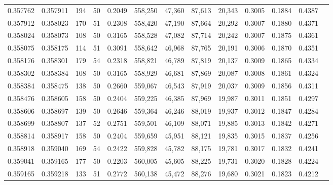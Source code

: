 \begin{tabular}{rrrrrrrrrrrrr}
0.357762 & 0.357911 &   194 &  50 &                                     0.2049 & 558,250 &  47,360 &  87,613 &  20,343 & 0.3005 & 0.1884 & 0.4387 \\
0.357912 & 0.358023 &   170 &  51 &                                     0.2308 & 558,420 &  47,190 &  87,664 &  20,292 & 0.3007 & 0.1880 & 0.4371 \\
0.358024 & 0.358073 &   108 &  50 &                                     0.3165 & 558,528 &  47,082 &  87,714 &  20,242 & 0.3007 & 0.1875 & 0.4361 \\
0.358075 & 0.358175 &   114 &  51 &                                     0.3091 & 558,642 &  46,968 &  87,765 &  20,191 & 0.3006 & 0.1870 & 0.4351 \\
0.358176 & 0.358301 &   179 &  54 &                                     0.2318 & 558,821 &  46,789 &  87,819 &  20,137 & 0.3009 & 0.1865 & 0.4334 \\
0.358302 & 0.358384 &   108 &  50 &                                     0.3165 & 558,929 &  46,681 &  87,869 &  20,087 & 0.3008 & 0.1861 & 0.4324 \\
0.358384 & 0.358475 &   138 &  50 &                                     0.2660 & 559,067 &  46,543 &  87,919 &  20,037 & 0.3009 & 0.1856 & 0.4311 \\
0.358476 & 0.358605 &   158 &  50 &                                     0.2404 & 559,225 &  46,385 &  87,969 &  19,987 & 0.3011 & 0.1851 & 0.4297 \\
0.358606 & 0.358697 &   139 &  50 &                                     0.2646 & 559,364 &  46,246 &  88,019 &  19,937 & 0.3012 & 0.1847 & 0.4284 \\
0.358699 & 0.358807 &   137 &  52 &                                     0.2751 & 559,501 &  46,109 &  88,071 &  19,885 & 0.3013 & 0.1842 & 0.4271 \\
0.358814 & 0.358917 &   158 &  50 &                                     0.2404 & 559,659 &  45,951 &  88,121 &  19,835 & 0.3015 & 0.1837 & 0.4256 \\
0.358918 & 0.359040 &   169 &  54 &                                     0.2422 & 559,828 &  45,782 &  88,175 &  19,781 & 0.3017 & 0.1832 & 0.4241 \\
0.359041 & 0.359165 &   177 &  50 &                                     0.2203 & 560,005 &  45,605 &  88,225 &  19,731 & 0.3020 & 0.1828 & 0.4224 \\
0.359165 & 0.359218 &   133 &  51 &                                     0.2772 & 560,138 &  45,472 &  88,276 &  19,680 & 0.3021 & 0.1823 & 0.4212 \\

\end{tabular}
